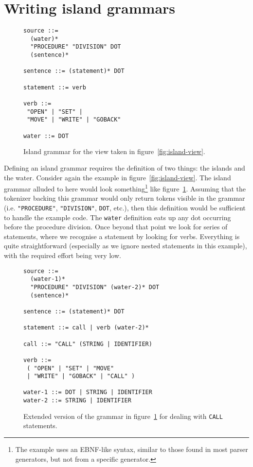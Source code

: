 \documentclass[a4paper]{article}
\begin{document}

\section{Writing island grammars}
\label{classic-approach}

\begin{figure}
\centering
\begin{lstlisting}
source ::=
  (water)*
  "PROCEDURE" "DIVISION" DOT
  (sentence)*

sentence ::= (statement)* DOT

statement ::= verb

verb ::=
 "OPEN" | "SET" |
 "MOVE" | "WRITE" | "GOBACK"

water ::= DOT
\end{lstlisting}
\caption{Island grammar for the view taken in figure~\ref{fig:island-view}.}
\label{fig:classic-grammar}
\end{figure}

Defining an island grammar requires the definition of two things: the islands and the water. Consider again the example in figure~\ref{fig:island-view}. The island grammar alluded to here would look something\footnote{\scriptsize The example uses an EBNF-like syntax, similar to those found in most parser generators, but not from a specific generator.} like figure~\ref{fig:classic-grammar}. Assuming that the tokenizer backing this grammar would only return tokens visible in the grammar (i.e. \lstinline|"PROCEDURE"|, \lstinline|"DIVISION"|, \lstinline|DOT|, etc.), then this definition would be sufficient to handle the example code. The \lstinline|water| definition eats up any dot occurring before the procedure division. Once beyond that point we look for series of statements, where we recognise a statement by looking for verbs. Everything is quite straightforward (especially as we ignore nested statements in this example), with the required effort being very low.

\begin{figure}
\centering
\begin{lstlisting}
source ::=
  (water-1)*
  "PROCEDURE" "DIVISION" (water-2)* DOT
  (sentence)*

sentence ::= (statement)* DOT

statement ::= call | verb (water-2)*

call ::= "CALL" (STRING | IDENTIFIER)

verb ::=
 ( "OPEN" | "SET" | "MOVE"
 | "WRITE" | "GOBACK" | "CALL" )

water-1 ::= DOT | STRING | IDENTIFIER
water-2 ::= STRING | IDENTIFIER
\end{lstlisting}
\caption{Extended version of the grammar in figure~\ref{fig:classic-grammar} for dealing with \lstinline|CALL| statements.}
\label{fig:extended-grammar}
\end{figure}
\end{document}
